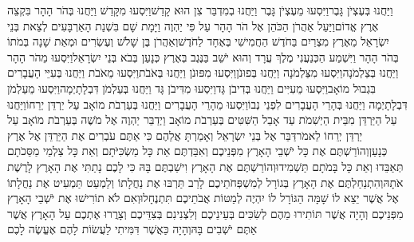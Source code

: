 \documentclass[../main/main.tex]{subfiles}
\begin{document}
\begin{multicols}{\ncols}
וַיַּחֲנוּ בְּעֶצְיֹן גָּבֶר\PreVerseSpace{}וַיִּסְעוּ מֵעֶצְיֹן גָּבֶר וַיַּחֲנוּ בְמִדְבַּר צִן הוּא קָדֵשׁ\PreVerseSpace{}וַיִּסְעוּ מִקָּדֵשׁ וַיַּחֲנוּ בְּהֹר הָהָר בִּקְצֵה אֶרֶץ אֱדוֹם\PreVerseSpace{}וַיַּעַל אַהֲרֹן הַכֹּהֵן אֶל הֹר הָהָר עַל פִּי יַהְוֶה וַיָּמָת שָׁם בִּשְׁנַת הָאַרְבָּעִים לְצֵאת בְּנֵי יִשְׂרָאֵל מֵאֶרֶץ מִצְרַיִם בַּחֹדֶשׁ הַחֲמִישִׁי בְּאֶחָד לַחֹדֶשׁ\PreVerseSpace{}וְאַהֲרֹן בֶּן שָׁלֹשׁ וְעֶשְׂרִים וּמְאַת שָׁנָה בְּמֹתוֹ בְּהֹר הָהָר \ClosedSection{}וַיִּשְׁמַע הַכְּנַעֲנִי מֶלֶךְ עֲרָד וְהוּא יֹשֵׁב בַּנֶּגֶב בְּאֶרֶץ כְּנָעַן בְּבֹא בְּנֵי יִשְׂרָאֵל\PreVerseSpace{}וַיִּסְעוּ מֵהֹר הָהָר וַיַּחֲנוּ בְּצַלְמֹנָה\PreVerseSpace{}וַיִּסְעוּ מִצַּלְמֹנָה וַיַּחֲנוּ בְּפוּנֹן\PreVerseSpace{}וַיִּסְעוּ מִפּוּנֹן וַיַּחֲנוּ בְּאֹבֹת\PreVerseSpace{}וַיִּסְעוּ מֵאֹבֹת וַיַּחֲנוּ בְּעִיֵּי הָעֲבָרִים בִּגְבוּל מוֹאָב\PreVerseSpace{}וַיִּסְעוּ מֵעִיִּים וַיַּחֲנוּ בְּדִיבֹן גָּד\PreVerseSpace{}וַיִּסְעוּ מִדִּיבֹן גָּד וַיַּחֲנוּ בְּעַלְמֹן דִּבְלָתָיְמָה\PreVerseSpace{}וַיִּסְעוּ מֵעַלְמֹן דִּבְלָתָיְמָה וַיַּחֲנוּ בְּהָרֵי הָעֲבָרִים לִפְנֵי נְבוֹ\PreVerseSpace{}וַיִּסְעוּ מֵהָרֵי הָעֲבָרִים וַיַּחֲנוּ בְּעַרְבֹת מוֹאָב עַל יַרְדֵּן יְרֵחוֹ\PreVerseSpace{}וַיַּחֲנוּ עַל הַיַּרְדֵּן מִבֵּית הַיְשִׁמֹת עַד אָבֵל הַשִּׁטִּים בְּעַרְבֹת מוֹאָב \ClosedSection{}וַיְדַבֵּר יַהְוֶה אֶל מֹשֶׁה בְּעַרְבֹת מוֹאָב עַל יַרְדֵּן יְרֵחוֹ לֵאמֹר\PreVerseSpace{}דַּבֵּר אֶל בְּנֵי יִשְׂרָאֵל וְאָמַרְתָּ אֲלֵהֶם כִּי אַתֶּם עֹבְרִים אֶת הַיַּרְדֵּן אֶל אֶרֶץ כְּנָעַן\PreVerseSpace{}וְהוֹרַשְׁתֶּם אֶת כָּל יֹשְׁבֵי הָאָרֶץ מִפְּנֵיכֶם וְאִבַּדְתֶּם אֵת כָּל מַשְׂכִּיֹּתָם וְאֵת כָּל צַלְמֵי מַסֵּכֹתָם תְּאַבֵּדוּ וְאֵת כָּל בָּמֹתָם תַּשְׁמִידוּ\PreVerseSpace{}וְהוֹרַשְׁתֶּם אֶת הָאָרֶץ וִישַׁבְתֶּם בָּהּ כִּי לָכֶם נָתַתִּי אֶת הָאָרֶץ לָרֶשֶׁת אֹתָהּ\PreVerseSpace{}וְהִתְנַחַלְתֶּם אֶת הָאָרֶץ בְּגוֹרָל לְמִשְׁפְּחֹתֵיכֶם לָרַב תַּרְבּוּ אֶת נַחֲלָתוֹ וְלַמְעַט תַּמְעִיט אֶת נַחֲלָתוֹ אֶל אֲשֶׁר יֵצֵא לוֹ שָׁמָּה הַגּוֹרָל לוֹ יִהְיֶה לְמַטּוֹת אֲבֹתֵיכֶם תִּתְנֶחָלוּ\PreVerseSpace{}וְאִם לֹא תוֹרִישׁוּ אֶת יֹשְׁבֵי הָאָרֶץ מִפְּנֵיכֶם וְהָיָה אֲשֶׁר תּוֹתִירוּ מֵהֶם לְשִׂכִּים בְּעֵינֵיכֶם וְלִצְנִינִם בְּצִדֵּיכֶם וְצָרֲרוּ אֶתְכֶם עַל הָאָרֶץ אֲשֶׁר אַתֶּם יֹשְׁבִים בָּהּ\PreVerseSpace{}וְהָיָה כַּאֲשֶׁר דִּמִּיתִי לַעֲשׂוֹת לָהֶם אֶעֱשֶׂה לָכֶם\OpenSection{}\par

\end{multicols}
\end{document}
